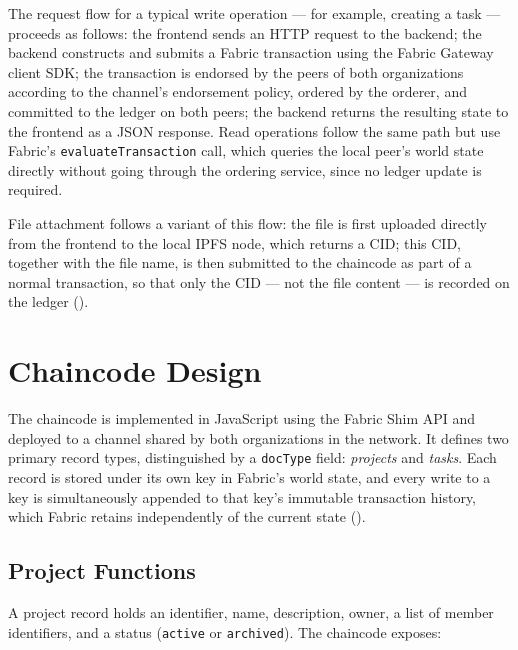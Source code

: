 The request flow for a typical write operation — for example, creating a task — proceeds as follows: the frontend sends an HTTP request to the backend; the backend constructs and submits a Fabric transaction using the Fabric Gateway client SDK; the transaction is endorsed by the peers of both organizations according to the channel's endorsement policy, ordered by the orderer, and committed to the ledger on both peers; the backend returns the resulting state to the frontend as a JSON response. Read operations follow the same path but use Fabric's \texttt{evaluateTransaction} call, which queries the local peer's world state directly without going through the ordering service, since no ledger update is required.

File attachment follows a variant of this flow: the file is first uploaded directly from the frontend to the local IPFS node, which returns a CID; this CID, together with the file name, is then submitted to the chaincode as part of a normal transaction, so that only the CID — not the file content — is recorded on the ledger ().

\section{Chaincode Design}
\label{sec:chaincode-design}

The chaincode is implemented in JavaScript using the Fabric Shim API and deployed to a channel shared by both organizations in the network. It defines two primary record types, distinguished by a \texttt{docType} field: \emph{projects} and \emph{tasks}. Each record is stored under its own key in Fabric's world state, and every write to a key is simultaneously appended to that key's immutable transaction history, which Fabric retains independently of the current state ().

\subsection{Project Functions}

A project record holds an identifier, name, description, owner, a list of member identifiers, and a status (\texttt{active} or \texttt{archived}). The chaincode exposes:

